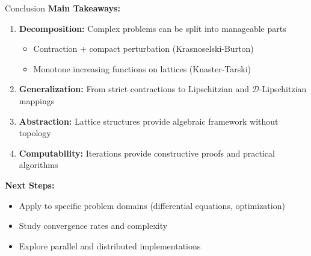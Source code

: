 \documentclass[aspectratio=169,10pt]{beamer}
\begin{document}
\begin{frame}{Conclusion}
    \textbf{Main Takeaways:}
    \begin{enumerate}
        \item \textbf{Decomposition:} Complex problems can be split into manageable parts
        \begin{itemize}
            \item Contraction + compact perturbation (Krasnoselski-Burton)
            \item Monotone increasing functions on lattices (Knaster-Tarski)
        \end{itemize}
        \vspace{0.2cm}

        \item \textbf{Generalization:} From strict contractions to Lipschitzian and $\mathcal{D}$-Lipschitzian mappings
        \vspace{0.2cm}

        \item \textbf{Abstraction:} Lattice structures provide algebraic framework without topology
        \vspace{0.2cm}

        \item \textbf{Computability:} Iterations provide constructive proofs and practical algorithms
    \end{enumerate}

    \vspace{0.5cm}
    \textbf{Next Steps:}
    \begin{itemize}
        \item Apply to specific problem domains (differential equations, optimization)
        \item Study convergence rates and complexity
        \item Explore parallel and distributed implementations
    \end{itemize}
\end{frame}
\end{document}
